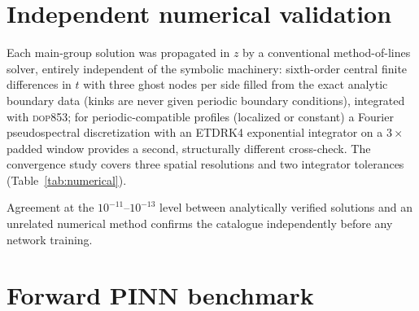 \documentclass[11pt,a4paper]{article}
\begin{document}
\section{Independent numerical validation}
\label{sec:numerical}

Each main-group solution was propagated in $z$ by a conventional
method-of-lines solver, entirely independent of the symbolic machinery:
sixth-order central finite differences in $t$ with three ghost nodes per side
filled from the exact analytic boundary data (kinks are never given periodic
boundary conditions), integrated with \textsc{dop853}; for
periodic-compatible profiles (localized or constant) a Fourier pseudospectral
discretization with an ETDRK4 exponential integrator on a $3\times$ padded
window provides a second, structurally different cross-check. The convergence
study covers three spatial resolutions and two integrator tolerances
(Table~\ref{tab:numerical}).

\begin{table}[htbp]\centering
\caption{Convergence study of the independent solver. The finite-difference
scheme exhibits its design order ($\approx6$; the constant branch is at the
rounding floor, where measured ``orders'' are meaningless). The ETDRK4
cross-check on the sech branch is limited to $\sim10^{-6}$ by periodic tail
truncation of the non-periodic profile, as expected.}
\label{tab:numerical}
\small

\end{table}

Agreement at the $10^{-11}$--$10^{-13}$ level between analytically verified
solutions and an unrelated numerical method confirms the catalogue
independently before any network training.

\section{Forward PINN benchmark}
\label{sec:forward}
\end{document}
